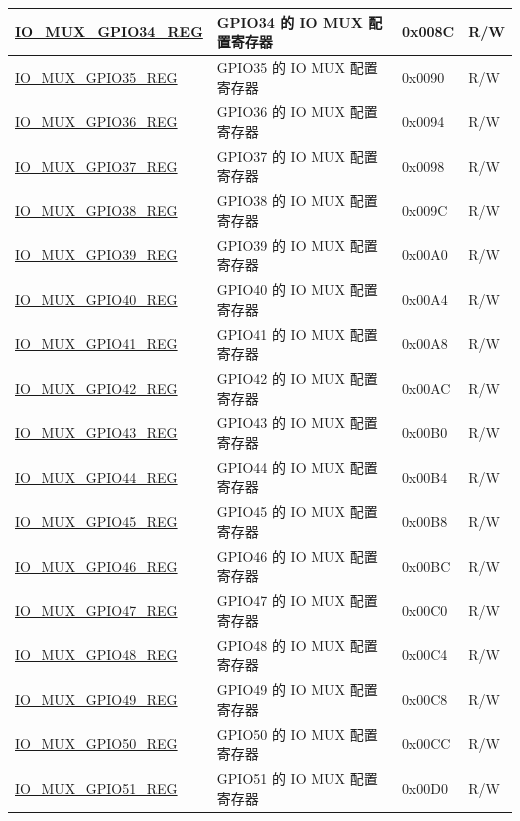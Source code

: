 \begin{longtable}{ | p{6cm} | p{7.2cm} | p{1.3cm} | p{1cm} | }
\hyperref[regdesc:IOMUXGPIONREG]{IO\_MUX\_GPIO34\_REG} & GPIO34 的 IO MUX 配置寄存器 & 0x008C & R/W \\ \hline
\hyperref[regdesc:IOMUXGPIONREG]{IO\_MUX\_GPIO35\_REG} & GPIO35 的 IO MUX 配置寄存器 & 0x0090 & R/W \\ \hline
\hyperref[regdesc:IOMUXGPIONREG]{IO\_MUX\_GPIO36\_REG} & GPIO36 的 IO MUX 配置寄存器 & 0x0094 & R/W \\ \hline
\hyperref[regdesc:IOMUXGPIONREG]{IO\_MUX\_GPIO37\_REG} & GPIO37 的 IO MUX 配置寄存器 & 0x0098 & R/W \\ \hline
\hyperref[regdesc:IOMUXGPIONREG]{IO\_MUX\_GPIO38\_REG} & GPIO38 的 IO MUX 配置寄存器 & 0x009C & R/W \\ \hline
\hyperref[regdesc:IOMUXGPIONREG]{IO\_MUX\_GPIO39\_REG} & GPIO39 的 IO MUX 配置寄存器 & 0x00A0 & R/W \\ \hline
\hyperref[regdesc:IOMUXGPIONREG]{IO\_MUX\_GPIO40\_REG} & GPIO40 的 IO MUX 配置寄存器 & 0x00A4 & R/W \\ \hline
\hyperref[regdesc:IOMUXGPIONREG]{IO\_MUX\_GPIO41\_REG} & GPIO41 的 IO MUX 配置寄存器 & 0x00A8 & R/W \\ \hline
\hyperref[regdesc:IOMUXGPIONREG]{IO\_MUX\_GPIO42\_REG} & GPIO42 的 IO MUX 配置寄存器 & 0x00AC & R/W \\ \hline
\hyperref[regdesc:IOMUXGPIONREG]{IO\_MUX\_GPIO43\_REG} & GPIO43 的 IO MUX 配置寄存器 & 0x00B0 & R/W \\ \hline
\hyperref[regdesc:IOMUXGPIONREG]{IO\_MUX\_GPIO44\_REG} & GPIO44 的 IO MUX 配置寄存器 & 0x00B4 & R/W \\ \hline
\hyperref[regdesc:IOMUXGPIONREG]{IO\_MUX\_GPIO45\_REG} & GPIO45 的 IO MUX 配置寄存器 & 0x00B8 & R/W \\ \hline
\hyperref[regdesc:IOMUXGPIONREG]{IO\_MUX\_GPIO46\_REG} & GPIO46 的 IO MUX 配置寄存器 & 0x00BC & R/W \\ \hline
\hyperref[regdesc:IOMUXGPIONREG]{IO\_MUX\_GPIO47\_REG} & GPIO47 的 IO MUX 配置寄存器 & 0x00C0 & R/W \\ \hline
\hyperref[regdesc:IOMUXGPIONREG]{IO\_MUX\_GPIO48\_REG} & GPIO48 的 IO MUX 配置寄存器 & 0x00C4 & R/W \\ \hline
\hyperref[regdesc:IOMUXGPIONREG]{IO\_MUX\_GPIO49\_REG} & GPIO49 的 IO MUX 配置寄存器 & 0x00C8 & R/W \\ \hline
\hyperref[regdesc:IOMUXGPIONREG]{IO\_MUX\_GPIO50\_REG} & GPIO50 的 IO MUX 配置寄存器 & 0x00CC & R/W \\ \hline
\hyperref[regdesc:IOMUXGPIONREG]{IO\_MUX\_GPIO51\_REG} & GPIO51 的 IO MUX 配置寄存器 & 0x00D0 & R/W \\ \hline

\end{longtable}
